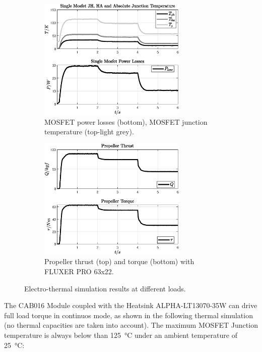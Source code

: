 \documentclass[11pt,a4paper,oneside]{book}
\numberwithin{equation}{section}
\theoremstyle{it}
\theoremstyle{definition}
\begin{document}
\begin{figure}[H]
	\centering
	\begin{subfigure}{0.5\textwidth}
		\centering
		\includegraphics[width = 200pt, angle = 0, 
		keepaspectratio]{figures/thermal_analysis/case_1/sim_results_fig_7.eps}
		\captionsetup{width=0.85\textwidth, font=footnotesize}	
		\caption{MOSFET power losses (bottom), MOSFET junction temperature (top-light grey).}
		\label{}
	\end{subfigure}%
	\begin{subfigure}{.5\textwidth}
		\centering
		\includegraphics[width = 200pt, angle = 0, 
		keepaspectratio]{figures/thermal_analysis/case_1/sim_results_fig_8.eps}
		\captionsetup{width=0.85\textwidth, font=footnotesize}	
		\caption{Propeller thrust (top) and torque (bottom) with FLUXER PRO 63x22.}
		\label{}
	\end{subfigure}
	\captionsetup{width=0.5\textwidth, font=small}	
	\caption{Electro-thermal simulation results at different loads.}
	\label{}
\end{figure}
The CAB016 Module coupled with the Heatsink ALPHA-LT13070-35W can drive full load torque in continuos mode, as shown in the following thermal simulation (no thermal capacities are taken into account). The maximum MOSFET Junction temperature is always below than \SI{125}{\celsius} under an ambient temperature of \SI{25}{\celsius}: 
\end{document}
